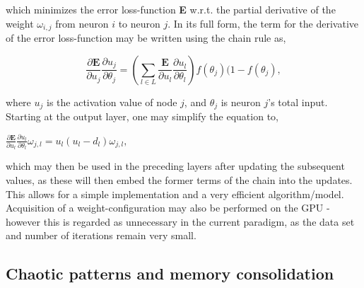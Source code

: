 \noindent
which minimizes the error loss-function \textbf{E} w.r.t. the partial derivative of the weight $\omega_{i,j}$ from neuron $i$ to neuron $j$.
In its full form, the term for the derivative of the error loss-function may be written using the chain rule as,

\begin{equation}
    \frac{\partial \textbf{E}}{\partial u_j}\frac{\partial u_j}{\partial \theta_j} = 
    (\sum_{l \in L}\frac{\textbf{E}}{\partial u_l}\frac{\partial u_l}{\partial \theta_l}) f(\theta_j)(1-f(\theta_j),
\end{equation}

\noindent
where $u_j$ is the activation value of node $j$, and $\theta_j$ is neuron $j$'s total input. Starting at the output layer, one may simplify the equation to,

\begin{center}
\begin{math}
    \frac{\partial \textbf{E}}{\partial u_l} \frac{\partial u_l}{\partial \theta_l} \omega_{j,l} = 
    u_l (u_l - d_l) \omega_{j,l},
\end{math}
\end{center}

which may then be used in the preceding layers after updating the subsequent values, as these will then embed the former terms of the chain into the updates. This allows for a simple implementation and a very efficient algorithm/model. Acquisition of a weight-configuration may also be performed on the GPU - however this is regarded as unnecessary in the current paradigm, as the data set and number of iterations remain very small.



\subsection{Chaotic patterns and memory consolidation}\label{subsection:hpc-pseudopatterns}

